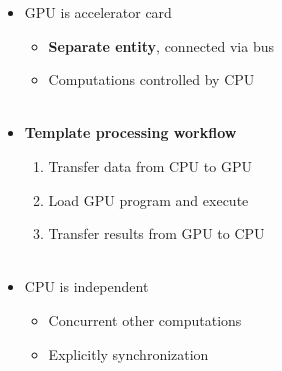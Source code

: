 \documentclass[aspectratio=1610]{beamer}
\begin{document}
\begin{frame}
\begin{columns}
\begin{column}{0.28\textwidth}
\begin{figure}
            \end{figure}
        \end{column}
        \begin{column}{0.48\textwidth}
            \begin{itemize}
                \item GPU is accelerator card
                \begin{itemize}
                    \item \textbf{Separate entity}, connected via bus
                    \item Computations controlled by CPU\\~
                \end{itemize}
                \item \textbf{Template processing workflow}
                \begin{enumerate}
                    \item Transfer data from CPU to GPU
                    \item Load GPU program and execute
                    \item Transfer results from GPU to CPU\\~
                \end{enumerate}
                \item CPU is independent
                \begin{itemize}
                    \item Concurrent other computations
                    \item Explicitly synchronization
                \end{itemize}
            \end{itemize}
        \end{column}
    \end{columns}
\end{frame}
\end{document}
